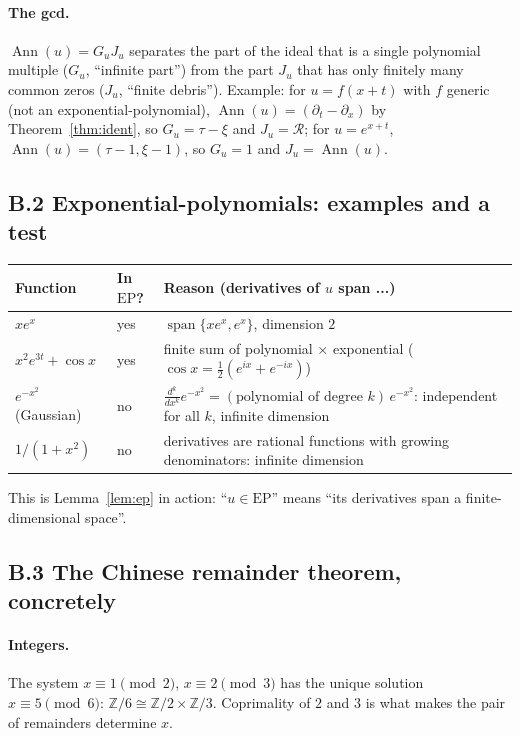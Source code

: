 \documentclass[11pt]{article}
\theoremstyle{plain}
\theoremstyle{definition}
\theoremstyle{remark}
\newcommand{\Z}{\mathbb{Z}}
\newcommand{\ring}{\mathcal{R}}            %
\DeclareMathOperator{\Ann}{Ann}             %
\DeclareMathOperator{\spn}{span}
\newcommand{\EP}{\mathrm{EP}}               %
\begin{document}
\paragraph{The gcd.} $\Ann(u)=G_uJ_u$ separates the part of the ideal that is a single polynomial multiple ($G_u$, ``infinite part'') from the part $J_u$ that has only finitely many common zeros ($J_u$, ``finite debris''). Example: for $u=f(x+t)$ with $f$ generic (not an exponential-polynomial), $\Ann(u)=(\partial_t-\partial_x)$ by Theorem~\ref{thm:ident}, so $G_u=\tau-\xi$ and $J_u=\ring$; for $u=e^{x+t}$, $\Ann(u)=(\tau-1,\xi-1)$, so $G_u=1$ and $J_u=\Ann(u)$.

\subsection*{B.2 Exponential-polynomials: examples and a test}
\begin{center}\small
\begin{tabular}{@{}L{5.4cm}L{2.3cm}L{6.8cm}@{}}
\toprule
Function & In $\EP$? & Reason (derivatives of $u$ span ...)\\\midrule
$xe^{x}$ & yes & $\spn\{xe^x,e^x\}$, dimension $2$\\
$x^2e^{3t}+\cos x$ & yes & finite sum of polynomial $\times$ exponential ($\cos x=\tfrac12(e^{ix}+e^{-ix})$)\\
$e^{-x^2}$ (Gaussian) & no & $\frac{d^k}{dx^k}e^{-x^2}=(\text{polynomial of degree }k)\,e^{-x^2}$: independent for all $k$, infinite dimension\\
$1/(1+x^2)$ & no & derivatives are rational functions with growing denominators: infinite dimension\\
\bottomrule
\end{tabular}
\end{center}
This is Lemma~\ref{lem:ep} in action: ``$u\in\EP$'' means ``its derivatives span a finite-dimensional space''.

\subsection*{B.3 The Chinese remainder theorem, concretely}
\paragraph{Integers.} The system $x\equiv1\pmod2$, $x\equiv2\pmod3$ has the unique solution $x\equiv5\pmod6$: $\Z/6\cong\Z/2\times\Z/3$. Coprimality of $2$ and $3$ is what makes the pair of remainders determine $x$.
\end{document}
